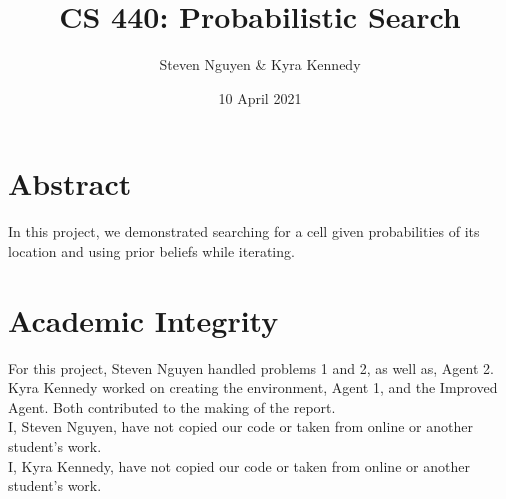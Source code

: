 \documentclass[12pt]{report}
\title{CS 440: Probabilistic Search}
\author{Steven Nguyen \& Kyra Kennedy}
\date{10 April 2021}
\begin{document}
\begin{titlepage}
\maketitle
\end{titlepage}

\section{Abstract}
In this project, we demonstrated searching for a cell given probabilities of its location and using prior beliefs while iterating.

\section{Academic Integrity}
For this project, Steven Nguyen handled problems 1 and 2, as well as, Agent 2. Kyra Kennedy worked on creating the environment, Agent 1, and the Improved Agent. Both contributed to the making of the report. \\
I, Steven Nguyen, have not copied our code or taken from online or another student's work. \\
I, Kyra Kennedy, have not copied our code or taken from online or another student's work.
\end{document}
